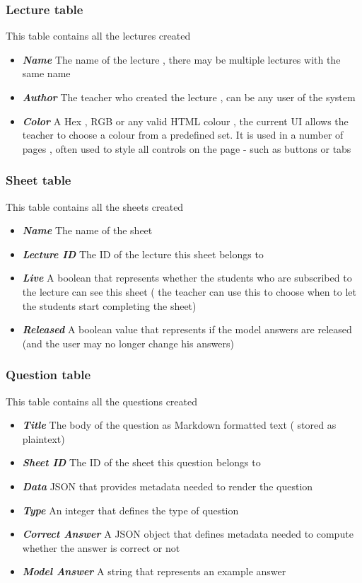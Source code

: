 \subsubsection{Lecture table}
This table contains all the lectures created

\begin{itemize}
	\item \textit{\textbf{Name}} The name of the lecture , there may be multiple lectures with the same name
	\item  \textit{\textbf{Author}} The teacher who created the lecture , can be any user of the system
	\item  \textit{\textbf{Color}} A Hex , RGB or any valid HTML colour , the current UI allows the teacher to choose a colour from a predefined set. It is used in a number of pages , often used to style all controls on the page - such as buttons or tabs	
\end{itemize}

\subsubsection{Sheet table}
This table contains all the sheets created

\begin{itemize}
	\item  \textit{\textbf{Name}} The name of the sheet
	\item  \textit{\textbf{Lecture ID}} The ID of the lecture this sheet belongs to
	\item  \textit{\textbf{Live}} A boolean that represents whether the students who are subscribed to the lecture can see this sheet ( the teacher can use this to choose when to let the students start completing the sheet)
	\item  \textit{\textbf{Released}} A boolean value that represents if the model answers are released (and the user may no longer change his answers)
\end{itemize}

\subsubsection{Question table}
This table contains all the questions created

\begin{itemize}
	\item  \textit{\textbf{Title}} The body of the question as Markdown formatted text ( stored as plaintext)
	\item  \textit{\textbf{Sheet ID}} The ID of the sheet this question belongs to
	\item  \textit{\textbf{Data}} JSON that provides metadata needed to render the question
	\item  \textit{\textbf{Type}} An integer that defines the type of question
	\item  \textit{\textbf{Correct Answer}} A JSON object that defines metadata needed to compute whether the answer is correct or not	
	\item  \textit{\textbf{Model Answer}} A string that represents an example answer
\end{itemize}

